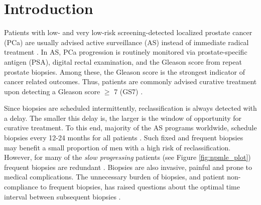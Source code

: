 \section{Introduction}

Patients with low- and very low-risk screening-detected localized prostate cancer (PCa) are usually advised active surveillance (AS) instead of immediate radical treatment \citep{briganti2018active}. In AS, PCa progression is routinely monitored via prostate-specific antigen (PSA), digital rectal examination, and the Gleason score from repeat prostate biopsies. Among these, the Gleason score is the strongest indicator of cancer related outcomes. Thus, patients are commonly advised curative treatment upon detecting a Gleason score $\geq$ 7 (GS7) \citep{bul2013active}.

Since biopsies are scheduled intermittently, reclassification is always detected with a delay. The smaller this delay is, the larger is the window of opportunity for curative treatment. To this end, majority of the AS programs worldwide, schedule biopsies every 12-24 months for all patients \citep{nieboer2018active,loeb2014heterogeneity}. Such fixed and frequent biopsies may benefit a small proportion of men with a high risk of reclassification. However, for many of the \textit{slow progressing} patients (see Figure \ref{fig:npmle_plot}) frequent biopsies are redundant . Biopsies are also invasive, painful and prone to medical complications. The unnecessary burden of biopsies, and patient non-compliance \citep{bokhorst2015compliance} to frequent biopsies, has raised questions about the optimal time interval between subsequent biopsies \citep{inoue2018comparative, bratt2013study}.

